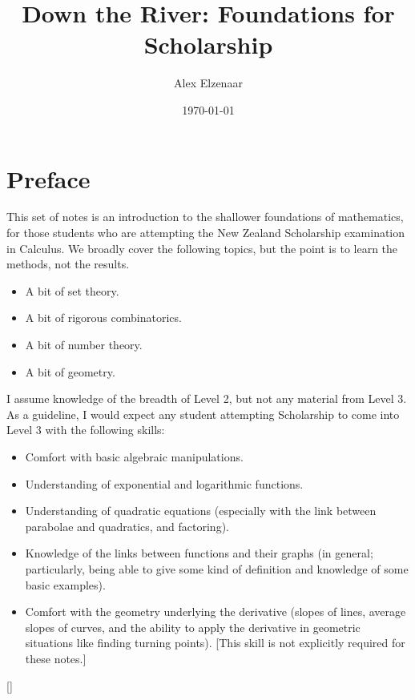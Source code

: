 \documentclass[a4paper,leqno]{article}
\title{Down the River: Foundations for Scholarship}
\author{Alex Elzenaar}
\date{\today}
\numberwithin{equation}{section}
\theoremstyle{definition}
\theoremstyle{remark}
\begin{document}
\maketitle
\setcounter{tocdepth}{1}
\tableofcontents
\section*{Preface}
This set of notes is an introduction to the shallower foundations of mathematics, for those students who
are attempting the New Zealand Scholarship examination in Calculus. We broadly cover the following topics,
but the point is to learn the methods, not the results.
\begin{itemize}
  \item A bit of set theory.
  \item A bit of rigorous combinatorics.
  \item A bit of number theory.
  \item A bit of geometry.
\end{itemize}

I assume knowledge of the breadth of Level 2, but not any material from Level 3. As a guideline, I would
expect any student attempting Scholarship to come into Level 3 with the following skills:
\begin{itemize}
  \item Comfort with basic algebraic manipulations.
  \item Understanding of exponential and logarithmic functions.
  \item Understanding of quadratic equations (especially with the link between parabolae and quadratics, and factoring).
  \item Knowledge of the links between functions and their graphs (in general; particularly, being able to give some kind
        of definition and knowledge of some basic examples).
  \item Comfort with the geometry underlying the derivative (slopes of lines, average slopes of curves, and the ability
        to apply the derivative in geometric situations like finding turning points). [This skill is not explicitly required for these notes.]
\end{itemize}

[{\titlerule[0.8pt]}]
\let\oldsection\section
\renewcommand\section{\clearpage\oldsection}
\end{document}
